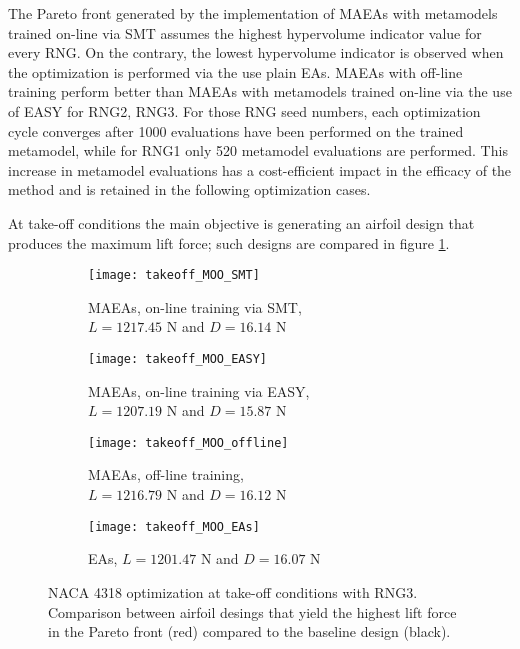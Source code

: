 The Pareto front generated by the implementation of MAEAs with 
metamodels trained on-line via SMT assumes the highest hypervolume 
indicator value for every RNG. On the contrary, the lowest 
hypervolume indicator is observed when the optimization is 
performed via the use plain EAs. MAEAs with off-line training 
perform better than MAEAs with metamodels trained on-line via the 
use of EASY for RNG2, RNG3. For those RNG seed numbers, 
each optimization cycle converges after 1000 evaluations have been 
performed on the trained metamodel, while for RNG1 only 520 
metamodel evaluations are performed. This increase in metamodel 
evaluations has a cost-efficient impact in the efficacy of the 
method and is retained in the following optimization cases.

\newpage


At take-off conditions the main objective is generating an airfoil
design that produces the maximum lift force; such designs are 
compared in figure \ref{fig:takeoff_MOO_comparison}.

\begin{figure}[h!]
\centering
	\begin{subfigure}[b]{0.49\textwidth}
	\centering
	\caption{MAEAs, on-line training via SMT, 
	\\  $L \!= \!1217.45$ N and $D \!= \!16.14$ N}
	\texttt{[image: takeoff\_MOO\_SMT]} 
	\end{subfigure}
	\hfill
	\begin{subfigure}[b]{0.49\textwidth}
	\centering
	\caption{MAEAs, on-line training via EASY, 
	\\ $L \!= \!1207.19$ N and $D \!= \!15.87$ N}
	\texttt{[image: takeoff\_MOO\_EASY]}   
	\end{subfigure}
	\hfill
	\begin{subfigure}[b]{0.49\textwidth}
	\centering
	\caption{MAEAs, off-line training, 
	\\ $L \!= \!1216.79$ N and $D \!= \!16.12$ N}
	\texttt{[image: takeoff\_MOO\_offline]} 
	\end{subfigure}
	\hfill
	\begin{subfigure}[b]{0.49\textwidth}
	\centering
	\caption{EAs, $L \!= \!1201.47$ N and $D \!= \!16.07$ N}
	\texttt{[image: takeoff\_MOO\_EAs]}   
	\end{subfigure}
\caption{NACA 4318 optimization at take-off conditions with RNG3. 
Comparison between airfoil desings that yield the highest lift 
force in the Pareto front (red) compared to the baseline design 
(black).} 
\label{fig:takeoff_MOO_comparison}
\end{figure}

